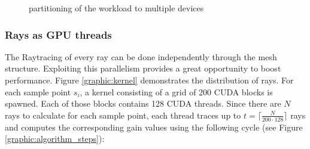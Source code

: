 \begin{figure}[H]
  \centerline
  {}
  \caption{partitioning of the workload to multiple devices}
  \label{graphic:multigpu}
\end{figure}

\subsubsection{Rays as GPU threads}
    The Raytracing of every ray can be done independently through the mesh
    structure.  Exploiting this parallelism provides a great opportunity to
    boost performance. Figure \ref{graphic:kernel} demonstrates the distribution
    of rays. For each sample point $s_i$, a kernel consisting of a grid of 200
    CUDA blocks is spawned. Each of those blocks contains 128 CUDA threads.
    Since there are $N$ rays to calculate for each sample point, each thread
    traces up to $t = \lceil\frac {N}{200\cdot128}\rceil$ rays and computes the
    corresponding gain values using the following cycle (see Figure
    \ref{graphic:algorithm_steps}):
    
